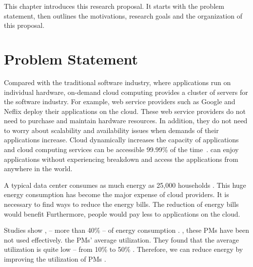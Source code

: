 This chapter introduces this research proposal. It starts with the problem statement, then outlines the motivations, research goals and the organization of this proposal.

\section{Problem Statement}
\label{sec:statement}

 Compared with the traditional software industry, where applications run
on individual hardware, on-demand cloud computing provides a cluster of servers for the software industry. For example, 
web service providers such as Google and Neflix deploy their applications on the cloud. These web service providers 
do not need to purchase and maintain hardware resources. 
In addition, they do not need to worry 
about scalability and availability issues when demands of their applications increase. Cloud dynamically increases the capacity of applications and cloud computing services can be accessible 99.99\% of the time~\cite{adhikari:2012uq}.
 can enjoy applications without experiencing breakdown and access the applications from anywhere in the world.

A typical data center consumes as much energy as 25,000 households \cite{dayarathna:2016ua}. 
This huge energy consumption has become the major expense of cloud providers. It is necessary to find ways to reduce the energy bills. 
The reduction of energy bills would benefit  
Furthermore, people would pay less to applications on the cloud. 

Studies show \cite{Barroso:2007jt, Shen:2015hm},   -- more than 40\% -- of energy consumption . ,
these PMs have been not used effectively. the PMs' average utilization. They found that the average utilization is quite low 
-- from 10\% to 50\% \cite{Hameed:2016cmb}.
Therefore, we can reduce energy by improving the utilization of PMs .


